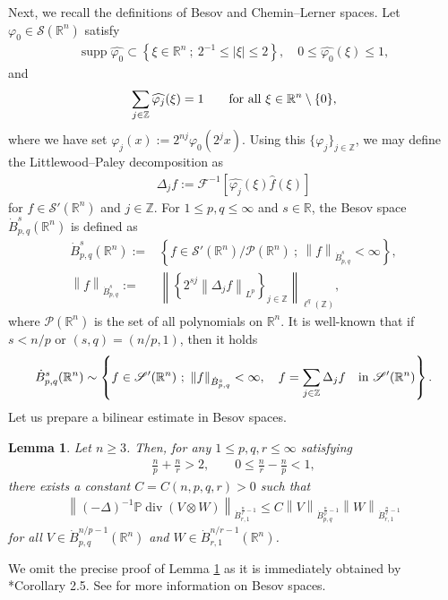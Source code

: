 \documentclass[a4paper,12pt,reqno]{amsart}
\theoremstyle{plain}
\newtheorem{lemm}[thm]{Lemma}
\theoremstyle{definition}
\renewcommand{\div}{\operatorname{div}}
\newcommand{\dB}{\dot{B}}
\newcommand{\supp}{\operatorname{supp}}
\renewcommand{\leq}{\leqslant}
\renewcommand{\geq}{\geqslant}
\newcommand{\n}[1]{{\left\|#1\right\|}}
\newcommand{\R}{\mathbb{R}}
\newcommand{\Z}{\mathbb{Z}}
\newcommand{\lp}[1]{\left[#1\right]}
\newcommand{\Mp}[1]{\left\{#1\right\}}
\begin{document}
Next, we recall the definitions of Besov and Chemin--Lerner spaces.
Let $\varphi_0 \in \mathscr{S}(\mathbb{R}^n)$ satisfy 
\begin{align}
    \supp \widehat{\varphi_0} \subset \Mp{ \xi \in \mathbb{R}^n\ ;\ 2^{-1} \leq | \xi | \leq 2 },\quad
    0 \leq \widehat{\varphi_0}(\xi) \leq 1, 
\end{align}
and 
\begin{align}
    \sum_{j \in \mathbb{Z}}
    \widehat{\varphi_j}(\xi) = 1 \qquad {\rm for\ all\ }\xi \in  \mathbb{R}^n \setminus \{0\},
\end{align}
where we have set $\varphi_j(x):=2^{nj}\varphi_0(2^jx)$.
Using this $\{\varphi_j\}_{j \in \Z}$, we may define the Littlewood--Paley decomposition as 
\begin{align}
    \Delta_j f := \mathscr{F}^{-1}\lp{\widehat{\varphi_j}(\xi)\widehat{f}(\xi)}
\end{align}
for $f \in \mathscr{S}'(\R^n)$ and $j \in \Z$.
For $1 \leq p,q \leq \infty$ and $s \in \mathbb{R}$, the Besov space $\dB_{p,q}^s(\mathbb{R}^n)$ is defined as 
\begin{align}
    \dB_{p,q}^s(\mathbb{R}^n)
    :={}&
    \Mp{
    f \in \mathscr{S}'(\mathbb{R}^n)/\mathscr{P}(\mathbb{R}^n)
    \ ; \ 
    \n{f}_{\dB_{p,q}^s}<\infty
    },\\
    \n{f}_{\dB_{p,q}^s}
    :={}&
    \n{
    \Mp{
    2^{sj}
    \n{\Delta_j f}_{L^p}
    }_{j \in \mathbb{Z}}
    }_{\ell^{q}(\mathbb{Z})},
\end{align}
where $\mathscr{P}(\mathbb{R}^n)$ is the set of all polynomials on $\mathbb{R}^n$.
It is well-known that if $s <n/p$ or $(s,q) = (n/p,1)$, then it holds
\begin{align}
    \dB_{p,q}^s(\mathbb{R}^n)
    \sim
    \Mp{
    f \in \mathscr{S}'(\mathbb{R}^n)
    \ ; \ 
    \n{f}_{\dB_{p,q}^s}<\infty,\quad
    f = \sum_{j \in \mathbb{Z}}\Delta_j f \quad {\rm in\ }\mathscr{S}'(\mathbb{R}^n)
    }.
\end{align}
Let us prepare a bilinear estimate in Besov spaces.
\begin{lemm}\label{lemm:nonlin-sta}
    Let $n \geq 3$.
    Then, for any $1 \leq p,q,r \leq \infty$ satisfying 
    \begin{align}\label{p-r}
        \frac{n}{p}+\frac{n}{r} > 2,
        \qquad
        0 \leq \frac{n}{r} - \frac{n}{p} < 1,
    \end{align}
    there exists a constant $C=C(n,p,q,r)>0$ such that
    \begin{align}
        \n{(-\Delta)^{-1}\mathbb{P}\div (V \otimes W)}_{\dB_{r,1}^{\frac{n}{r}-1}}
        \leq 
        C
        \n{V}_{\dB_{p,q}^{\frac{n}{p}-1}}
        \n{W}_{\dB_{r,1}^{\frac{n}{r}-1}}
    \end{align}
    for all $V \in \dB_{p,q}^{n/p-1}(\R^n)$ and $W \in \dB_{r,1}^{n/r-1}(\R^n)$.
\end{lemm}
We omit the precise proof of Lemma \ref{lemm:nonlin-sta} as it is immediately obtained by \cite{Abidi-Paicu-2007}*{Corollary 2.5}.
See \cites{Bah-Che-Dan-11,Saw-18} for more information on Besov spaces.
\end{document}
